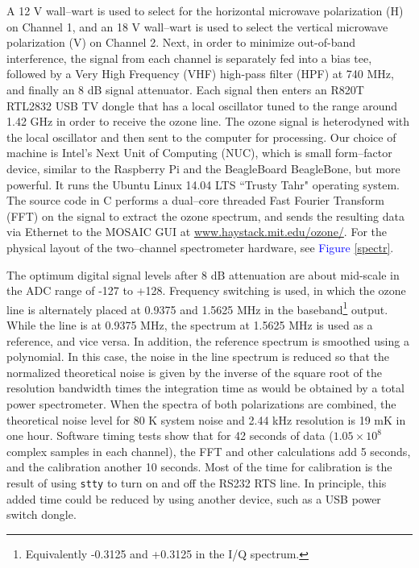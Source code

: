 \documentclass[11pt]{article}
\begin{document}
A 12 V wall--wart is used to select for the horizontal microwave polarization (H) on Channel 1, and an 18 V wall--wart is used to select the vertical microwave polarization (V) on Channel 2. Next, in order to minimize out-of-band interference, the signal from each channel is separately fed into a bias tee, followed by a Very High Frequency (VHF) high-pass filter (HPF) at 740 MHz, and finally an 8 dB signal attenuator. Each signal then enters an R820T RTL2832 USB TV dongle that has a local oscillator tuned to the range around 1.42 GHz in order to receive the ozone line. The ozone signal is heterodyned with the local oscillator and then sent to the computer for processing. Our choice of machine is Intel's Next Unit of Computing (NUC), which is small form--factor device, similar to the Raspberry Pi and the BeagleBoard BeagleBone, but more powerful. It runs the Ubuntu Linux 14.04 LTS ``Trusty Tahr" operating system. The source code in C performs a dual--core threaded Fast Fourier Transform (FFT) on the signal to extract the ozone spectrum, and sends the resulting data via Ethernet to the MOSAIC GUI at \url{www.haystack.mit.edu/ozone/}. For the physical layout of the two--channel spectrometer hardware, see \textcolor{blue}{Figure} \ref{spectr}. 

The optimum digital signal levels after 8 dB attenuation are about mid-scale in the ADC range of -127 to +128. Frequency switching is used, in which the ozone line is alternately placed at 0.9375 and 1.5625 MHz in the baseband\footnote{Equivalently -0.3125 and +0.3125 in the I/Q spectrum.} output. While the line is at 0.9375 MHz, the spectrum at 1.5625 MHz is used as a reference, and vice versa. In addition, the reference spectrum is smoothed using a polynomial. In this case, the noise in the line spectrum is reduced so that the normalized theoretical noise is given by the inverse of the square root of the resolution bandwidth times the integration time as would be obtained by a total power spectrometer. When the spectra of both polarizations are combined, the theoretical noise level for 80 K system noise and 2.44 kHz resolution is 19 mK in one hour. Software timing tests show that for 42 seconds of data ($1.05\times 10^{8}$ complex samples in each channel), the FFT and other calculations add 5 seconds, and the calibration another 10 seconds. Most of the time for calibration is the result of using \texttt{stty} to turn on and off the RS232 RTS line. In principle, this added time could be reduced by using another device, such as a USB power switch dongle.
\end{document}
